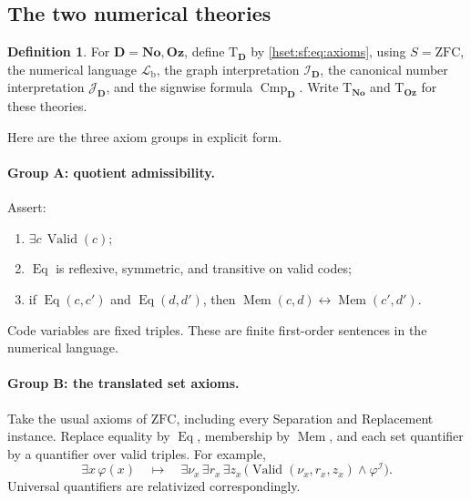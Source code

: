 \documentclass[11pt,letterpaper]{article}
\theoremstyle{definition}
\newtheorem{definition}[definition]{Definition}\aliascntresetthe{definition}
\theoremstyle{remark}
\newcommand{\No}{\mathbf{No}}
\newcommand{\I}{\mathcal I}
\newcommand{\J}{\mathcal J}
\newcommand{\ZFC}{\mathrm{ZFC}}
\newcommand{\Oz}{\mathbf{Oz}}
\newcommand{\Valid}{\operatorname{Valid}}
\newcommand{\Eqc}{\operatorname{Eq}}
\newcommand{\Memc}{\operatorname{Mem}}
\newcommand{\Cmp}{\operatorname{Cmp}}
\newcommand{\Dd}{\mathbf{D}}
\newcommand{\Lb}{\mathcal L_{\mathrm b}}
\newcommand{\Tth}{\mathrm{T}}
\begin{document}
\subsection{The two numerical theories}

\begin{definition}\label{hset:sf:def:nativetheories}
For $\Dd=\No,\Oz$, define $\Tth_{\Dd}$ by \eqref{hset:sf:eq:axioms}, using
$S=\ZFC$, the numerical language $\Lb$, the graph interpretation $\I_{\Dd}$, the
canonical number interpretation $\J_{\Dd}$, and the signwise formula
$\Cmp_{\Dd}$. Write $\Tth_{\No}$ and $\Tth_{\Oz}$ for these theories.
\end{definition}

Here are the three axiom groups in explicit form.

\paragraph{Group A: quotient admissibility.} Assert:
\begin{enumerate}
\item $\exists c\,\Valid(c)$;
\item $\Eqc$ is reflexive, symmetric, and transitive on valid codes;
\item if $\Eqc(c,c')$ and $\Eqc(d,d')$, then $\Memc(c,d)\leftrightarrow\Memc(c',d')$.
\end{enumerate}
Code variables are fixed triples. These are finite first-order sentences in the
numerical language.

\paragraph{Group B: the translated set axioms.} Take the usual axioms of $\ZFC$,
including every Separation and Replacement instance. Replace equality by $\Eqc$,
membership by $\Memc$, and each set quantifier by a quantifier over valid triples.
For example,
\[
 \exists x\,\varphi(x)\quad\mapsto\quad
 \exists \nu_x\,\exists r_x\,\exists z_x\,\bigl(\Valid(\nu_x,r_x,z_x)\land\varphi^{\I}\bigr).
\]
Universal quantifiers are relativized correspondingly.
\end{document}
